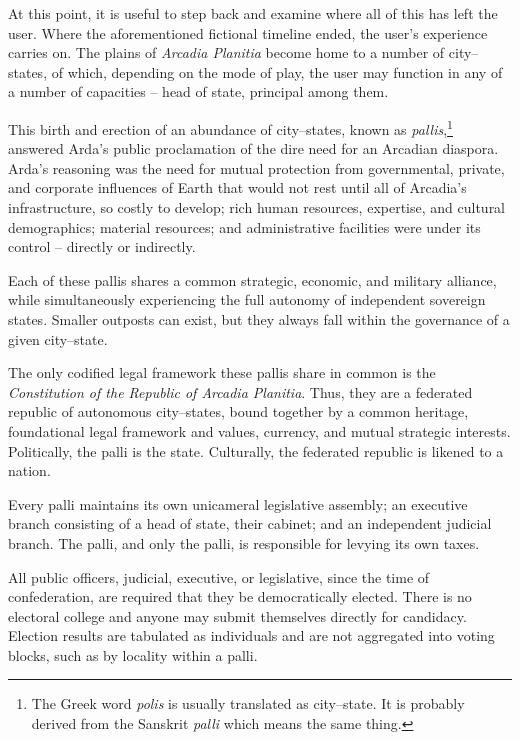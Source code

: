 

At this point, it is useful to step back and examine where all of this has left the user. Where the aforementioned fictional timeline ended, the user's experience carries on. The plains of {\it Arcadia Planitia} become home to a number of city--states, of which, depending on the mode of play, the user may function in any of a number of capacities -- head of state, principal among them.

This birth and erection of an abundance of city--states, known as {\it pallis},\footnote{The Greek word {\it polis} is usually translated as city--state. It is probably derived from the Sanskrit {\it palli} which means the same thing.} answered Arda's public proclamation of the dire need for an Arcadian diaspora. Arda's reasoning was the need for mutual protection from governmental, private, and corporate influences of Earth that would not rest until all of Arcadia's infrastructure, so costly to develop; rich human resources, expertise, and cultural demographics; material resources; and administrative facilities were under its control -- directly or indirectly.

Each of these pallis shares a common strategic, economic, and military alliance, while simultaneously experiencing the full autonomy of independent sovereign states. Smaller outposts can exist, but they always fall within the governance of a given city--state.

The only codified legal framework these pallis share in common is the {\it Constitution of the Republic of Arcadia Planitia}. Thus, they are a federated republic of autonomous city--states, bound together by a common heritage, foundational legal framework and values, currency, and mutual strategic interests. Politically, the palli is the state. Culturally, the federated republic is likened to a nation.

Every palli maintains its own unicameral legislative assembly; an executive branch consisting of a head of state, their cabinet; and an independent judicial branch. The palli, and only the palli, is responsible for levying its own taxes.

All public officers, judicial, executive, or legislative, since the time of confederation, are required that they be democratically elected. There is no electoral college and anyone may submit themselves directly for candidacy. Election results are tabulated as individuals and are not aggregated into voting blocks, such as by locality within a palli.

